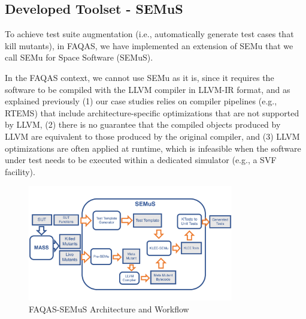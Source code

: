 
\newpage
\subsection{Developed Toolset - SEMuS}
\label{sec:semus}

\STARTCHANGEDWPT


To achieve test suite augmentation (i.e., automatically generate test cases that kill mutants), in FAQAS, we have implemented an extension of SEMu that we call SEMu for Space Software (SEMuS).



In the FAQAS context, we cannot use SEMu as it is, since it requires the software to be compiled with the LLVM compiler in LLVM-IR format, and as explained previously (1) our case studies relies on compiler pipelines (e.g., RTEMS) that include architecture-specific optimizations that are not supported by LLVM, (2) there is no guarantee that the compiled objects produced by LLVM are equivalent to those produced by the original compiler, and (3) LLVM optimizations are often applied at runtime, which is infeasible when the software under test needs to be executed within a dedicated simulator (e.g., a SVF facility).

\begin{figure}[tb]
\begin{center}
\includegraphics[width=0.8\textwidth]{images/semus-architecture}
\caption{FAQAS-SEMuS Architecture and Workflow}
\label{fig:semus_architecture}
\end{center}
\end{figure}

